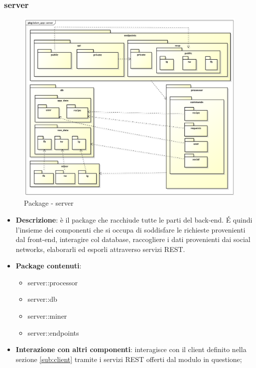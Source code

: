 \pagebreak


  \subsubsection{server} %
  \begin{figure}[htbp]
    \centering
    \centerline{\includegraphics[scale=0.38]{./images/server/server.pdf}}
    \caption{Package - server}
  \end{figure}


  \begin{itemize}
    \item \textbf{Descrizione}: è il package che racchiude tutte le parti del back-end. \'E quindi l'insieme dei componenti che si occupa di soddisfare le richieste provenienti dal front-end, interagire col database, raccogliere i dati provenienti dai social networks, elaborarli ed esporli attraverso servizi REST.
    \item \textbf{Package contenuti}:
      \begin{itemize}
        \item server::processor
        \item server::db
        \item server::miner
        \item server::endpoints
      \end{itemize}
    \item \textbf{Interazione con altri componenti}: interagisce con il client definito nella sezione \ref{sub:client} tramite i servizi REST offerti dal modulo in questione;
  \end{itemize}


